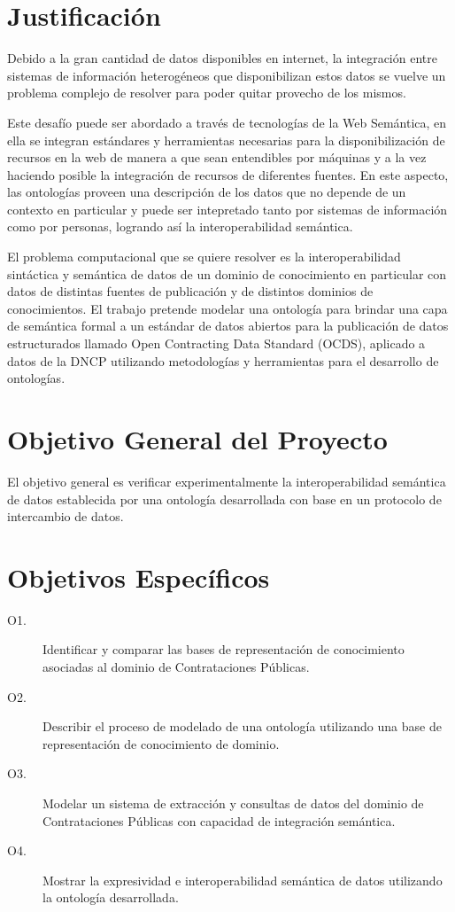 \section{Justificación}

Debido a la gran cantidad de datos disponibles en internet, la integración entre sistemas de información heterogéneos que disponibilizan estos datos se vuelve un problema complejo de resolver para poder quitar provecho de los mismos. 

Este desafío puede ser abordado a través de tecnologías de la Web Semántica, en ella se integran estándares y herramientas necesarias para la disponibilización de recursos en la web de manera a que sean entendibles por máquinas y a la vez haciendo posible la integración de recursos de diferentes fuentes. En este aspecto, las ontologías proveen una descripción de los datos que no depende de un contexto en particular y puede ser intepretado tanto por sistemas de información como por personas, logrando así la interoperabilidad semántica.

El problema computacional que se quiere resolver es la interoperabilidad sintáctica y semántica de datos de un dominio de conocimiento en particular con datos de distintas fuentes de publicación y de distintos dominios de conocimientos. El trabajo pretende modelar una ontología para brindar una capa de semántica formal a un estándar de datos abiertos para la publicación de datos estructurados llamado Open Contracting Data Standard (OCDS), aplicado a datos de la DNCP utilizando metodologías y herramientas para el desarrollo de ontologías. 


\section{Objetivo General del Proyecto}

El objetivo general es verificar experimentalmente la interoperabilidad semántica de datos establecida por una ontología desarrollada con base en un protocolo de intercambio de datos.


\section{Objetivos Específicos}
\label{objetivos especiicos}


\begin{description}
    \item[O1.] Identificar y comparar las bases de representación de conocimiento asociadas al dominio de Contrataciones Públicas.
    \item[O2.] Describir el proceso de modelado de una ontología utilizando una base de representación de conocimiento de dominio.
    \item[O3.] Modelar un sistema de extracción y consultas de datos del dominio de Contrataciones Públicas con capacidad de integración semántica.
    \item[O4.] Mostrar la expresividad e interoperabilidad semántica de datos utilizando la ontología desarrollada.
\end{description} 


